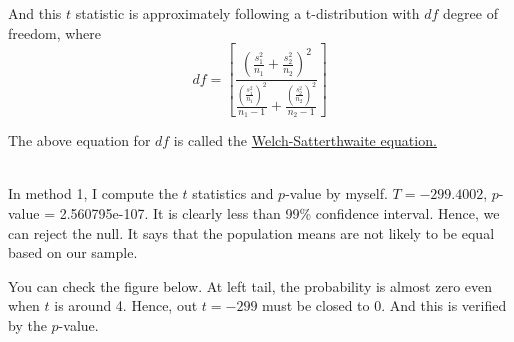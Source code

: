 \documentclass[12pt]{article}
\begin{document}
And this $ t $ statistic is approximately following a t-distribution
with $ df $ degree of freedom, where
\begin{equation*}
df = \left[ 
		\frac{(\frac{s_1^{2}}{n_1} + \frac{s_2^{2}}{n_2})^{2}}
		{ \frac{(\frac{s_1^{2}}{n_1})^{2} }{n_1 - 1} + 
		\frac{ (\frac{s_2^{2}}{n_2} )^{2} }{n_2 - 1}
		}
\right] 
\end{equation*}

The above equation for $ df $ is called the {\underline {
				Welch-Satterthwaite equation.
}}



\noindent{}\\


In method 1, I compute the $ t $ statistics and $ p $-value by
myself. $ T = -299.4002 $, $ p $-value = 2.560795e-107.
It is clearly less than 99\% confidence interval. Hence, we can reject
the null. It says that the population means are not likely to be equal
based on our sample.

You can check the figure below. At left tail, the probability is 
almost zero even when $ t $ is around 4. Hence, out $ t = -299 $ must
be closed to 0. And this is verified by the $ p $-value.
\end{document}
